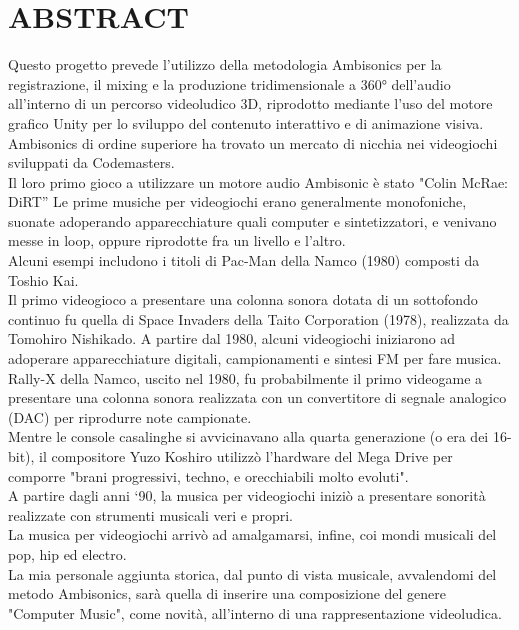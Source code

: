 
\chapter{ABSTRACT}
\label{chp:abstract}

Questo progetto prevede l'utilizzo della metodologia Ambisonics per la registrazione, il mixing e la produzione tridimensionale a 360° dell'audio all'interno di un percorso videoludico 3D, riprodotto mediante l'uso del motore grafico Unity per lo sviluppo del contenuto interattivo e di animazione visiva. \\
Ambisonics di ordine superiore ha trovato un mercato di nicchia nei videogiochi sviluppati da Codemasters. \\
 Il loro primo gioco a utilizzare un motore audio Ambisonic è stato "Colin McRae: DiRT”
Le prime musiche per videogiochi erano generalmente monofoniche, suonate adoperando apparecchiature quali computer e sintetizzatori, e venivano messe in loop, oppure riprodotte fra un livello e l'altro. \\
Alcuni esempi includono i titoli di Pac-Man della Namco (1980) composti da Toshio Kai. \\
 Il primo videogioco a presentare una colonna sonora dotata di un sottofondo continuo fu quella di Space Invaders della Taito Corporation (1978), realizzata da Tomohiro Nishikado. A partire dal 1980, alcuni videogiochi iniziarono ad adoperare apparecchiature digitali, campionamenti e sintesi FM per fare musica. \\
Rally-X della Namco, uscito nel 1980,
fu probabilmente il primo videogame a presentare una colonna sonora realizzata con un convertitore di segnale analogico (DAC) per riprodurre note campionate. \\
Mentre le console casalinghe si avvicinavano alla quarta generazione (o era dei 16-bit),
il compositore Yuzo Koshiro utilizzò l'hardware del Mega Drive per comporre "brani progressivi, techno, e orecchiabili molto evoluti". \\
A partire dagli anni `90, la musica per videogiochi iniziò a presentare sonorità realizzate con strumenti musicali veri e propri. \\
La musica per videogiochi arrivò ad amalgamarsi, infine, coi mondi musicali del pop, hip ed electro. \\
La mia personale aggiunta storica, dal punto di vista musicale, avvalendomi del metodo Ambisonics, sarà quella di inserire una composizione del genere "Computer Music", come novità, all'interno di una rappresentazione videoludica. \\

